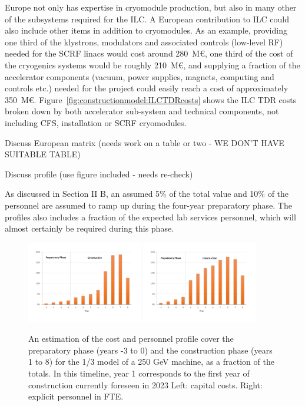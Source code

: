 \documentclass[%
 reprint,
 amsmath,amssymb,
 aps,
]{revtex4-1}
\begin{document}
Europe not only has expertise in cryomodule production, but also in many other 
of the subsystems required for the ILC. A European contribution to ILC could 
also include other items in addition to cryomodules. As an example, providing 
one third of the klystrons, modulators and associated controls (low-level RF) 
needed for the SCRF linacs would cost around 280~M\euro{}, one third of the cost of 
the cryogenics systems would be roughly 210~M\euro{}, and supplying a fraction of the 
accelerator components (vacuum, power supplies, magnets, computing and controls 
etc.) needed for the project could easily reach a cost of approximately 350~M\euro{}. 
Figure~\ref{fig:constructionmodel:ILCTDRcosts} shows the ILC TDR costs broken down by both accelerator sub-system and 
technical components, not including CFS, installation or SCRF cryomodules.

Discuss European matrix (needs work on a table or two - WE DON'T HAVE SUITABLE TABLE) 

Discuss profile (use figure included - needs re-check)

As discussed in Section II B, an assumed 5\% of the total value and 10\% of the personnel are assumed
to ramp up during the four-year preparatory phase. The profiles also includes a fraction
of the expected lab services personnel, which will almost certainly be required during this
phase. 

\begin{figure}[htbp]
\includegraphics[width=0.45\textwidth]{figures/profile-250GeV-MEUR-norm.pdf}
\includegraphics[width=0.45\textwidth]{figures/profile-250GeV-FTE-norm.pdf}
\caption{\label{fig:costprofile:costprofile} An estimation of the cost and personnel profile cover the preparatory phase (years -3 to 0) 
and the construction phase (years 1 to 8) for the 1/3 model of a 250 GeV machine, as a fraction of the
totals. In this timeline, 
year 1 corresponds to the first year of construction currently foreseen in 2023 
Left: capital costs. Right: explicit personnel in FTE.
}
\end{figure}
\end{document}
